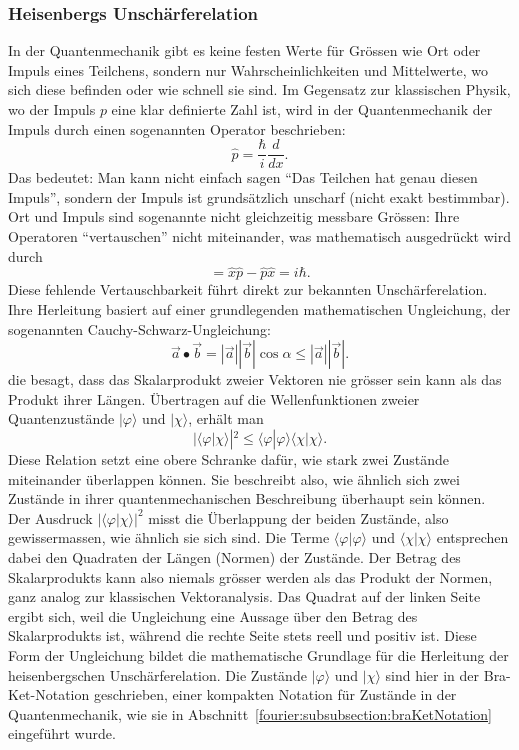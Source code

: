 	\subsubsection{Heisenbergs Unschärferelation%
	\label{fourier:subsubsection:unschaerferelation}}
		In der Quantenmechanik gibt es keine festen Werte für Grössen wie Ort oder Impuls eines Teilchens, sondern nur Wahrscheinlichkeiten und Mittelwerte, wo sich diese befinden oder wie schnell sie sind.
		Im Gegensatz zur klassischen Physik, wo der Impuls $p$ eine klar definierte Zahl ist, wird in der Quantenmechanik der Impuls durch einen sogenannten Operator beschrieben:
		\begin{equation}
			\hat{p} = \frac{\hbar}{i} \frac{d}{dx}.
		\end{equation}
		Das bedeutet:
		Man kann nicht einfach sagen ``Das Teilchen hat genau diesen Impuls'', sondern der Impuls ist grundsätzlich unscharf (nicht exakt bestimmbar).
		Ort und Impuls sind sogenannte nicht gleichzeitig messbare Grössen:
		Ihre Operatoren ``vertauschen'' nicht miteinander, was mathematisch ausgedrückt wird durch
		\begin{equation}
			[\hat{x},\hat{p}] = \hat{x} \hat{p} - \hat{p} \hat{x} = i \hbar.
		\end{equation}
		Diese fehlende Vertauschbarkeit führt direkt zur bekannten Unschärferelation.
		Ihre Herleitung basiert auf einer grundlegenden mathematischen Ungleichung, der sogenannten Cauchy-Schwarz-Ungleichung:
		\begin{equation}\label{fourier:equation:CauchySchwarzUngleichung}
			\vec{a} \bullet \vec{b} = |\vec{a}| |\vec{b}|\cos\alpha \le |\vec{a}| |\vec{b}|.
		\end{equation}
		die besagt, dass das Skalarprodukt zweier Vektoren nie grösser sein kann als das Produkt ihrer Längen.
		Übertragen auf die Wellenfunktionen zweier Quantenzustände $|\varphi\rangle$ und $|\chi\rangle$, erhält man
		\begin{equation}
			|\langle\varphi | \chi\rangle|^2 \le \langle\varphi | \varphi\rangle \langle\chi | \chi\rangle.
		\end{equation}
		Diese Relation setzt eine obere Schranke dafür, wie stark zwei Zustände miteinander überlappen können. Sie beschreibt also, wie ähnlich sich zwei Zustände in ihrer quantenmechanischen Beschreibung überhaupt sein können.
		Der Ausdruck $|\langle\varphi|\chi\rangle|^2$ misst die Überlappung der beiden Zustände, also gewissermassen, wie ähnlich sie sich sind.
		Die Terme $\langle\varphi|\varphi\rangle$ und $\langle\chi|\chi\rangle$ entsprechen dabei den Quadraten der Längen (Normen) der Zustände.
		Der Betrag des Skalarprodukts kann also niemals grösser werden als das Produkt der Normen, ganz analog zur klassischen Vektoranalysis.
		Das Quadrat auf der linken Seite ergibt sich, weil die Ungleichung eine Aussage über den Betrag des Skalarprodukts ist, während die rechte Seite stets reell und positiv ist.
		Diese Form der Ungleichung bildet die mathematische Grundlage für die Herleitung der heisenbergschen Unschärferelation.
		Die Zustände $|\varphi\rangle$ und $|\chi\rangle$ sind hier in der Bra-Ket-Notation geschrieben, einer kompakten Notation für Zustände in der Quantenmechanik, wie sie in Abschnitt~\ref{fourier:subsubsection:braKetNotation} eingeführt wurde.

